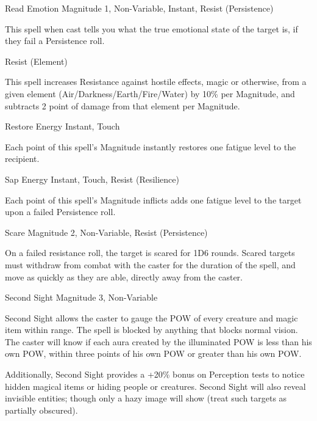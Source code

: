 \begin{rpg-spell}
{Read Emotion}
{Magnitude 1, Non-Variable, Instant, Resist (Persistence)}

This spell when cast tells you what the true emotional state of the target is, if they fail a Persistence roll.
\end{rpg-spell}


\begin{rpg-spell}
{Resist (Element)}
\nopagebreak
{}

This spell increases Resistance against hostile effects, magic or otherwise, from a given element (Air/Darkness/Earth/Fire/Water) by 10\% per Magnitude, and subtracts 2 point of damage from that element per Magnitude.
\end{rpg-spell}


\begin{rpg-spell}
{Restore Energy}
{Instant, Touch}

Each point of this spell’s Magnitude instantly restores one fatigue level to the recipient.
\end{rpg-spell}


\begin{rpg-spell}
{Sap Energy}
{Instant, Touch, Resist (Resilience)}

Each point of this spell’s Magnitude inflicts adds one fatigue level to the target upon a failed Persistence roll.
\end{rpg-spell}


\begin{rpg-spell}
{Scare}
{Magnitude 2, Non-Variable, Resist (Persistence)}

On a failed resistance roll, the target is scared for 1D6 rounds. Scared targets must withdraw from combat with the caster for the duration of the spell, and move as quickly as they are able, directly away from the caster.
\end{rpg-spell}


\begin{rpg-spell}
{Second Sight}
{Magnitude 3, Non-Variable}

Second Sight allows the caster to gauge the POW of every creature and magic item within range. The spell is blocked by anything that blocks normal vision. The caster will know if each aura created by the illuminated POW is less than his own POW, within three points of his own POW or greater than his own POW. 

Additionally, Second Sight provides a +20\% bonus on Perception tests to notice hidden magical items or hiding people or creatures. Second Sight will also reveal invisible entities; though only a hazy image will show (treat such targets as partially obscured). 
\end{rpg-spell}



